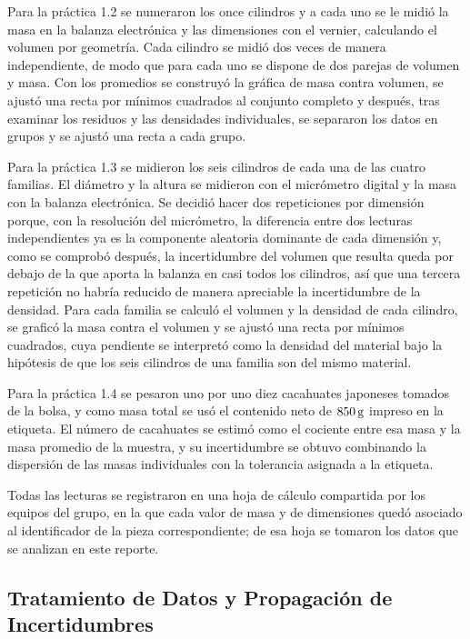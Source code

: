 Para la práctica 1.2 se numeraron los once cilindros y a cada uno se le midió la masa en la balanza electrónica y las dimensiones con el vernier, calculando el volumen por geometría. Cada cilindro se midió dos veces de manera independiente, de modo que para cada uno se dispone de dos parejas de volumen y masa. Con los promedios se construyó la gráfica de masa contra volumen, se ajustó una recta por mínimos cuadrados al conjunto completo y después, tras examinar los residuos y las densidades individuales, se separaron los datos en grupos y se ajustó una recta a cada grupo.

Para la práctica 1.3 se midieron los seis cilindros de cada una de las cuatro familias. El diámetro y la altura se midieron con el micrómetro digital y la masa con la balanza electrónica. Se decidió hacer dos repeticiones por dimensión porque, con la resolución del micrómetro, la diferencia entre dos lecturas independientes ya es la componente aleatoria dominante de cada dimensión y, como se comprobó después, la incertidumbre del volumen que resulta queda por debajo de la que aporta la balanza en casi todos los cilindros, así que una tercera repetición no habría reducido de manera apreciable la incertidumbre de la densidad. Para cada familia se calculó el volumen y la densidad de cada cilindro, se graficó la masa contra el volumen y se ajustó una recta por mínimos cuadrados, cuya pendiente se interpretó como la densidad del material bajo la hipótesis de que los seis cilindros de una familia son del mismo material.

Para la práctica 1.4 se pesaron uno por uno diez cacahuates japoneses tomados de la bolsa, y como masa total se usó el contenido neto de $850\,\mathrm{g}$ impreso en la etiqueta. El número de cacahuates se estimó como el cociente entre esa masa y la masa promedio de la muestra, y su incertidumbre se obtuvo combinando la dispersión de las masas individuales con la tolerancia asignada a la etiqueta.

Todas las lecturas se registraron en una hoja de cálculo compartida por los equipos del grupo, en la que cada valor de masa y de dimensiones quedó asociado al identificador de la pieza correspondiente; de esa hoja se tomaron los datos que se analizan en este reporte.

\subsection{Tratamiento de Datos y Propagación de Incertidumbres}

